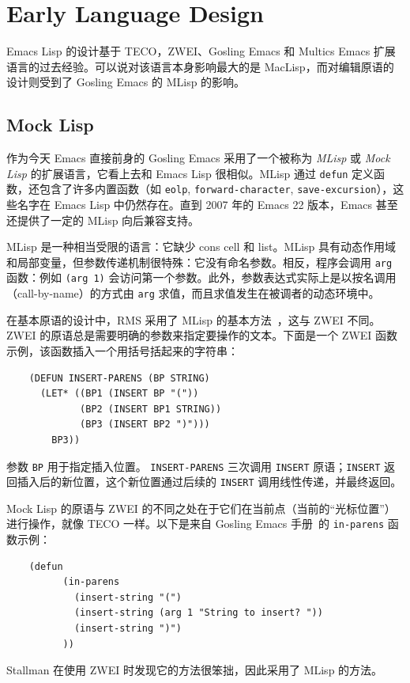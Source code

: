 \documentclass[format=acmsmall,screen]{acmart}
\begin{document}
\section{Early Language Design}         %
\label{sec:early-history}

Emacs Lisp 的设计基于 TECO，ZWEI、Gosling Emacs 和 Multics Emacs 扩展语言的过去经验。可以说对该语言本身影响最大的是 MacLisp，而对编辑原语的设计则受到了 Gosling Emacs 的 MLisp 的影响。

\subsection{Mock Lisp}
\label{sec:mock-lisp}

作为今天 Emacs 直接前身的 Gosling Emacs 采用了一个被称为 \emph{MLisp} 或 \emph{Mock Lisp} 的扩展语言，它看上去和 Emacs Lisp 很相似。MLisp 通过 \texttt{defun} 定义函数，还包含了许多内置函数（如 \texttt{eolp}, \texttt{forward-character}, \texttt{save-excursion}），这些名字在 Emacs Lisp 中仍然存在。直到 2007 年的 Emacs 22 版本，Emacs 甚至还提供了一定的 MLisp 向后兼容支持。

MLisp 是一种相当受限的语言：它缺少 cons cell 和 list。MLisp 具有动态作用域和局部变量，但参数传递机制很特殊：它没有命名参数。相反，程序会调用 \texttt{arg} 函数：例如 \texttt{(arg 1)} 会访问第一个参数。此外，参数表达式实际上是以按名调用（call-by-name）的方式由 \texttt{arg} 求值，而且求值发生在被调者的动态环境中。

在基本原语的设计中，RMS 采用了 MLisp 的基本方法~\cite{Stallman2018-personal}，这与 ZWEI 不同。ZWEI 的原语总是需要明确的参数来指定要操作的文本。下面是一个 ZWEI 函数示例，该函数插入一个用括号括起来的字符串：
%
\begin{verbatim}
    (DEFUN INSERT-PARENS (BP STRING)
      (LET* ((BP1 (INSERT BP "("))
             (BP2 (INSERT BP1 STRING))
             (BP3 (INSERT BP2 ")")))
        BP3))
\end{verbatim}
%

参数 \texttt{BP} 用于指定插入位置。 \texttt{INSERT-PARENS} 三次调用 \texttt{INSERT} 原语；\texttt{INSERT} 返回插入后的新位置，这个新位置通过后续的 \texttt{INSERT} 调用线性传递，并最终返回。

Mock Lisp 的原语与 ZWEI 的不同之处在于它们在当前点（当前的“光标位置”）进行操作，就像 TECO 一样。以下是来自 Gosling Emacs 手册~\cite{Gosling1981}的 \texttt{in-parens} 函数示例：
%
\begin{verbatim}
    (defun
          (in-parens
            (insert-string "(")
            (insert-string (arg 1 "String to insert? "))
            (insert-string ")")
          ))
\end{verbatim}
%
Stallman 在使用 ZWEI 时发现它的方法很笨拙，因此采用了 MLisp 的方法。
\end{document}
